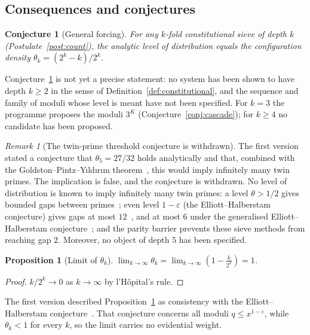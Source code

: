 \documentclass[12pt]{amsart}
\theoremstyle{plain}
\newtheorem{proposition}[theorem]{Proposition}
\newtheorem{conjecture}[theorem]{Conjecture}
\theoremstyle{definition}
\theoremstyle{remark}
\newtheorem{remark}[theorem]{Remark}
\newcommand{\thetak}{\theta_k}
\begin{document}
\subsection{Consequences and conjectures}

\begin{conjecture}[General forcing]
\label{conj:general}
For any $k$-fold constitutional sieve of depth $k$
(Postulate~\ref{post:count}), the analytic level of distribution equals the
configuration density $\thetak = (2^k - k)/2^k$.
\end{conjecture}

Conjecture~\ref{conj:general} is not yet a precise statement: no system has been
shown to have depth $k \geq 2$ in the sense of Definition~\ref{def:constitutional},
and the sequence and family of moduli whose level is meant have not been
specified. For $k = 3$ the programme proposes the moduli $3^K$
(Conjecture~\ref{conj:cascade}); for $k \geq 4$ no candidate has been proposed.

\begin{remark}[The twin-prime threshold conjecture is withdrawn]
\label{rem:twinprime}
The first version stated a conjecture that $\theta_5 = 27/32$ holds
analytically and that, combined with the Goldston--Pintz--Y\i{}ld\i{}r\i{}m
theorem~\cite{GPY2009}, this would imply infinitely many twin primes. The
implication is false, and the conjecture is withdrawn. No level of distribution
is known to imply infinitely many twin primes: a level $\theta > 1/2$ gives
bounded gaps between primes~\cite{GPY2009}; even level $1 - \varepsilon$ (the
Elliott--Halberstam conjecture) gives gaps at most $12$~\cite{Maynard2015}, and
at most $6$ under the generalised Elliott--Halberstam
conjecture~\cite{Polymath8b}; and the parity barrier prevents these sieve methods
from reaching gap $2$. Moreover, no object of depth $5$ has been specified.
\end{remark}

\begin{proposition}[Limit of $\thetak$]
\label{prop:eh}
$\displaystyle\lim_{k \to \infty} \thetak = \lim_{k \to \infty}
\left(1 - \frac{k}{2^k}\right) = 1$.
\end{proposition}

\begin{proof}
$k/2^k \to 0$ as $k \to \infty$ by l'H\^opital's rule.
\end{proof}

The first version described Proposition~\ref{prop:eh} as consistency with the
Elliott--Halberstam conjecture~\cite{EH1970}. That conjecture concerns all moduli
$q \leq x^{1-\varepsilon}$, while $\thetak < 1$ for every $k$, so the limit
carries no evidential weight.
\end{document}
